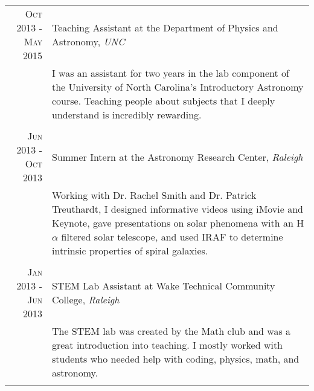 \documentclass[a4paper,10pt]{article} %
\begin{document}
\begin{tabular}{r|p{11cm}}
\textsc{Oct 2013 - May 2015} & Teaching Assistant at the Department of Physics and Astronomy, \emph{UNC} \\
& \footnotesize{I was an assistant for two years in the lab component of the University of North Carolina's Introductory Astronomy course. Teaching people about subjects that I deeply understand is incredibly rewarding.}\\
\multicolumn{2}{c}{} \\


\textsc{Jun 2013 - Oct 2013} & Summer Intern at the Astronomy Research Center, \emph{Raleigh}\\
& \footnotesize{Working with Dr. Rachel Smith and Dr. Patrick Treuthardt, I designed informative videos using iMovie and Keynote, gave presentations on solar phenomena with an H$\alpha$ filtered solar telescope, and used IRAF to determine intrinsic properties of spiral galaxies.}\\
\multicolumn{2}{c}{} \\


\textsc{Jan 2013 - Jun 2013} & STEM Lab Assistant at Wake Technical Community College, \emph{Raleigh}\\
& \footnotesize{The STEM lab was created by the Math club and was a great introduction into teaching. I mostly worked with students who needed help with coding, physics, math, and astronomy.}\\
\multicolumn{2}{c}{} \\


\end{tabular}
\end{document}
